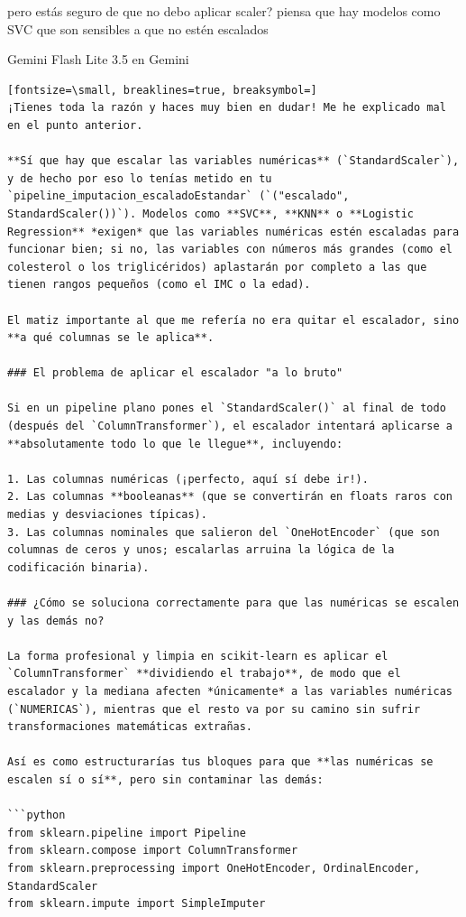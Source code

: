 \documentclass[12pt,a4paper,oneside]{book}
\begin{document}
\begin{iaprompt}
pero estás seguro de que no debo aplicar scaler? piensa que hay modelos como SVC que son sensibles a que no estén escalados
\end{iaprompt}
\begin{iaresp}{Gemini Flash Lite 3.5 en Gemini}
\begin{Verbatim}[fontsize=\small, breaklines=true, breaksymbol=]
¡Tienes toda la razón y haces muy bien en dudar! Me he explicado mal en el punto anterior.

**Sí que hay que escalar las variables numéricas** (`StandardScaler`), y de hecho por eso lo tenías metido en tu `pipeline_imputacion_escaladoEstandar` (`("escalado", StandardScaler())`). Modelos como **SVC**, **KNN** o **Logistic Regression** *exigen* que las variables numéricas estén escaladas para funcionar bien; si no, las variables con números más grandes (como el colesterol o los triglicéridos) aplastarán por completo a las que tienen rangos pequeños (como el IMC o la edad).

El matiz importante al que me refería no era quitar el escalador, sino **a qué columnas se le aplica**.

### El problema de aplicar el escalador "a lo bruto"

Si en un pipeline plano pones el `StandardScaler()` al final de todo (después del `ColumnTransformer`), el escalador intentará aplicarse a **absolutamente todo lo que le llegue**, incluyendo:

1. Las columnas numéricas (¡perfecto, aquí sí debe ir!).
2. Las columnas **booleanas** (que se convertirán en floats raros con medias y desviaciones típicas).
3. Las columnas nominales que salieron del `OneHotEncoder` (que son columnas de ceros y unos; escalarlas arruina la lógica de la codificación binaria).

### ¿Cómo se soluciona correctamente para que las numéricas se escalen y las demás no?

La forma profesional y limpia en scikit-learn es aplicar el `ColumnTransformer` **dividiendo el trabajo**, de modo que el escalador y la mediana afecten *únicamente* a las variables numéricas (`NUMERICAS`), mientras que el resto va por su camino sin sufrir transformaciones matemáticas extrañas.

Así es como estructurarías tus bloques para que **las numéricas se escalen sí o sí**, pero sin contaminar las demás:

```python
from sklearn.pipeline import Pipeline
from sklearn.compose import ColumnTransformer
from sklearn.preprocessing import OneHotEncoder, OrdinalEncoder, StandardScaler
from sklearn.impute import SimpleImputer


\end{Verbatim}
\end{iaresp}
\end{document}
